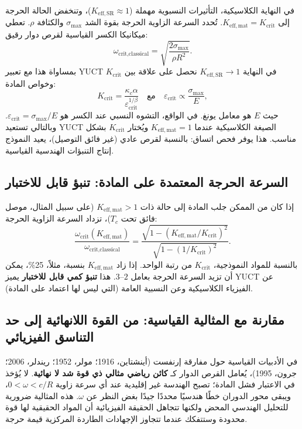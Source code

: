 \documentclass[12pt,a4paper]{article}
\newcommand{\kappac}{\kappa_c}
\newcommand{\betaf}{\beta}
\newcommand{\Keffmat}{K_{\mathrm{eff,mat}}}
\newcommand{\KeffSR}{K_{\mathrm{eff,SR}}}
\newcommand{\Kcrit}{K_{\mathrm{crit}}}
\begin{document}
	في النهاية الكلاسيكية، التأثيرات النسبوية مهملة (\(\KeffSR \approx 1\))، وتنخفض الحالة الحرجة إلى \(\Keffmat = \Kcrit\). تُحدد السرعة الزاوية الحرجة بقوة الشد \(\sigma_{\text{max}}\) والكثافة \(\rho\). تعطي ميكانيكا الكسر القياسية لقرص دوار رقيق:
	\[
	\omega_{\text{crit,classical}} = \sqrt{\frac{2\sigma_{\text{max}}}{\rho R^2}}.
	\]
	بمساواة هذا مع تعبير YUCT في النهاية \(\KeffSR \to 1\) نحصل على علاقة بين \(\Kcrit\) وخواص المادة:
	\[
	\Kcrit = \frac{\kappac \alpha}{\varepsilon_{\text{crit}}^{1/\betaf}} \quad \text{مع} \quad \varepsilon_{\text{crit}} \propto \frac{\sigma_{\text{max}}}{E},
	\]
	حيث \(E\) هو معامل يونغ. في الواقع، التشوه النسبي عند الكسر هو \(\varepsilon_{\text{crit}} = \sigma_{\text{max}}/E\). وبالتالي تستعيد YUCT الصيغة الكلاسيكية عندما \(\Keffmat = 1\) ويُختار \(\Kcrit\) بشكل مناسب. هذا يوفر فحص اتساق: بالنسبة لقرص عادي (غير فائق التوصيل)، يعيد النموذج إنتاج التنبؤات الهندسية القياسية.
	
	\subsection{السرعة الحرجة المعتمدة على المادة: تنبؤ قابل للاختبار}
	
	إذا كان من الممكن جلب المادة إلى حالة ذات \(\Keffmat > 1\) (على سبيل المثال، موصل فائق تحت \(T_c\))، تزداد السرعة الزاوية الحرجة:
	\[
	\frac{\omega_{\text{crit}}(K_{\mathrm{eff,mat}})}{\omega_{\text{crit,classical}}} = \frac{ \sqrt{1 - (\Keffmat/\Kcrit)^2} }{ \sqrt{1 - (1/\Kcrit)^2} }.
	\]
	بالنسبة للمواد النموذجية، \(\Kcrit\) من رتبة الواحد. إذا زاد \(\Keffmat\) بنسبة، مثلاً، 25\%، يمكن أن تزيد السرعة الحرجة بعامل \(2\)–\(3\). هذا \textbf{تنبؤ كمي قابل للاختبار} يميز YUCT عن الفيزياء الكلاسيكية وعن النسبية العامة (التي ليس لها اعتماد على المادة).
	
	\subsection{مقارنة مع المثالية القياسية: من القوة اللانهائية إلى حد التناسق الفيزيائي}
	
	في الأدبيات القياسية حول مفارقة إرنفست (أينشتاين، 1916؛ مولر، 1952؛ ريندلر، 2006؛ جرون، 1995)، يُعامل القرص الدوار كـ \textbf{كائن رياضي مثالي ذي قوة شد لا نهائية}. لا يُؤخذ في الاعتبار فشل المادة؛ تصبح الهندسة غير إقليدية عند أي سرعة زاوية \(0 < \omega < c/R\)، ويبقى محور الدوران خطًا هندسيًا محددًا جيدًا بغض النظر عن \(\omega\). هذه المثالية ضرورية للتحليل الهندسي المحض ولكنها تتجاهل الحقيقة الفيزيائية أن المواد الحقيقية لها قوة محدودة وستتفكك عندما تتجاوز الإجهادات الطاردة المركزية قيمة حرجة.
	
\end{document}
